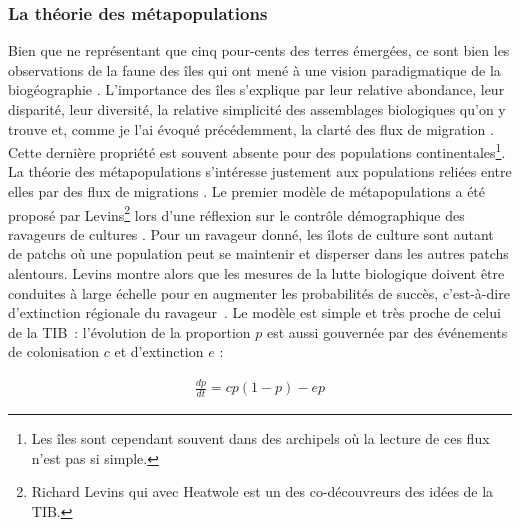 \subsubsection*{La théorie des
métapopulations}\label{la-thuxe9orie-des-muxe9tapopulations}

Bien que ne représentant que cinq pour-cents des terres émergées, ce
sont bien les observations de la faune des îles qui ont mené à une
vision paradigmatique de la biogéographie \citep{Simberloff1974a}.
L'importance des îles s'explique par leur relative abondance, leur
disparité, leur diversité, la relative simplicité des assemblages
biologiques qu'on y trouve et, comme je l'ai évoqué précédemment, la
clarté des flux de migration \citep{Simberloff1974a}. Cette dernière
propriété est souvent absente pour des populations
continentales\footnote{Les îles sont cependant souvent dans des
  archipels où la lecture de ces flux n'est pas si simple.}. La théorie
des métapopulations s'intéresse justement aux populations reliées entre
elles par des flux de migrations \citep{Hanski2010}. Le premier modèle
de métapopulations a été proposé par Levins\footnote{Richard Levins qui
  avec Heatwole est un des co-découvreurs des idées de la TIB.} lors
d'une réflexion sur le contrôle démographique des ravageurs de cultures
\citep{Levins1969}. Pour un ravageur donné, les îlots de culture sont
autant de patchs où une population peut se maintenir et disperser dans
les autres patchs alentours. Levins montre alors que les mesures de la
lutte biologique doivent être conduites à large échelle pour en
augmenter les probabilités de succès, c'est-à-dire d'extinction
régionale du ravageur~\citep{Levins1969}. Le modèle est simple et très
proche de celui de la TIB~: l'évolution de la proportion \(p\) est aussi
gouvernée par des événements de colonisation \(c\) et d'extinction \(e\)
:

\begin{eqnarray}
\label{eqMW}
\frac{dp}{dt} = cp(1-p)-ep
\end{eqnarray}

